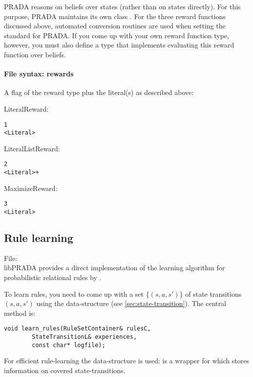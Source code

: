 \documentclass[10pt,twoside,twocolumn,fleqn]{article}
\begin{document}
PRADA reasons on beliefs over states (rather than on states directly). For
this purpose, PRADA maintains its own class . For the
three reward functions discussed above, automated conversion routines are
used when setting the standard  for PRADA. If you come up with
your own reward function type, however, you must also define a
 type that implements evaluating this reward function
over beliefs.


\paragraph{File syntax: rewards}

A flag of the reward type plus the literal(s) as described above:

LiteralReward:
\begin{lstlisting}
1
<Literal>
\end{lstlisting}

LiteralListReward:
\begin{lstlisting}
2
<Literal>+
\end{lstlisting}

MaximizeReward:
\begin{lstlisting}
3
<Literal>
\end{lstlisting}







\subsection{Rule learning}

File: \\

libPRADA provides a direct implementation of the learning algorithm for
probabilistic relational rules by \citet{pasula07ai}.

To learn rules, you need to come up with a set $\{(s,a,s')\}$ of state
transitions $(s,a,s')$ using the data-structure  (see
\ref{sec:state-transition}). The central method is:
\begin{lstlisting}
void learn_rules(RuleSetContainer& rulesC,
		StateTransitionL& experiences,
		const char* logfile);
\end{lstlisting}
For efficient rule-learning the data-structure  is
used:  is a wrapper for  which stores
information on covered state-transitions.
\end{document}
